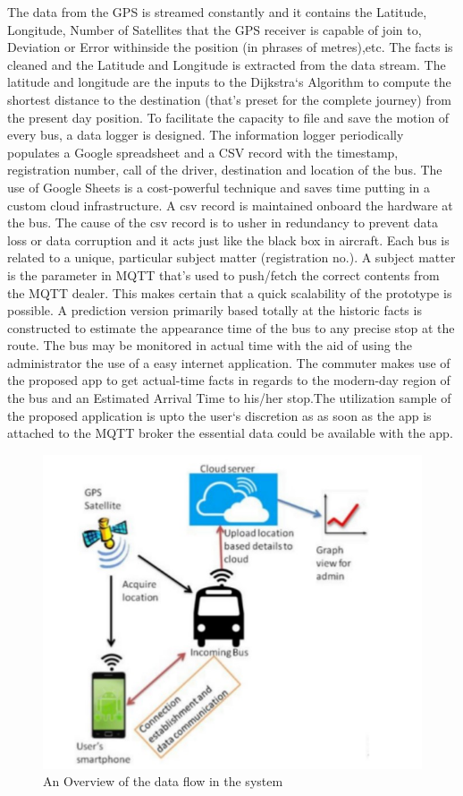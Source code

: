 The data from the GPS is streamed constantly and it contains the Latitude, Longitude, Number of Satellites that the GPS receiver is capable of join to, Deviation or Error withinside the position (in phrases of metres),etc. The facts is cleaned and the Latitude and Longitude is extracted from the data stream. The latitude and longitude are the inputs to the Dijkstra`s Algorithm to compute the shortest distance to the destination (that's preset for the complete journey) from the present day position. To facilitate the capacity to file and save the motion of every bus, a data logger is designed. The information logger periodically populates a Google spreadsheet and a CSV record with the timestamp, registration number, call of the driver, destination and location of the bus. The use of Google Sheets is a cost-powerful technique and saves time putting in a custom cloud infrastructure. A csv record is maintained onboard the hardware at the bus. The cause of the csv record is to usher in redundancy to prevent data loss or data corruption and it acts just like the black box in aircraft. Each bus is related to a unique, particular subject matter (registration no.). A subject matter is the parameter in MQTT that's used to push/fetch the correct contents from the MQTT dealer. This makes certain that a quick scalability of the prototype is possible. A prediction version primarily based totally at the historic facts is constructed to estimate the appearance time of the bus to any precise stop at the route. The bus may be monitored in actual time with the aid of using the administrator the use of a easy internet application. The commuter makes use of the proposed app to get actual-time facts in regards to the modern-day region of the bus and an Estimated Arrival Time to his/her stop.The utilization sample of the proposed application is upto the user`s discretion as as soon as the app is attached to the MQTT broker the essential data could be available with the app.


\begin{figure}
\centering
\includegraphics[width=1\textwidth]{overview.jpg}
\caption{An Overview of the data flow in the system}
\end{figure}
